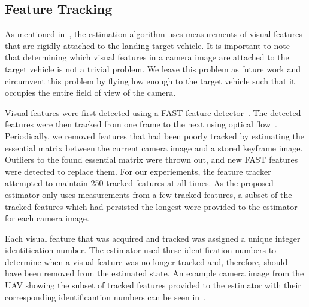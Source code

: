 
\subsection{Feature Tracking}
As mentioned in~,
the estimation algorithm uses measurements of visual features that are
rigidly attached to the landing target vehicle. It is important to note that
determining which visual features in a camera image are attached to
the target vehicle is not a trivial problem. We leave this problem as future work and
circumvent this problem by flying low enough to the target vehicle such that it
occupies the entire field of view of the camera.

Visual features were first detected using a FAST feature
detector~\cite{rosten2006machine}. The detected features were then tracked from one frame to
the next using optical flow~\cite{bouguet2001pyramidal}. Periodically, we
removed
features that had been poorly tracked by estimating the essential matrix between
the current camera image and a stored keyframe image. Outliers to the found
essential matrix were thrown out, and new FAST features were detected to replace
them. For our experiements, the feature tracker attempted to maintain 250
tracked features at all times. As the proposed estimator only uses measurements from a few
tracked features, a subset of the tracked features which had persisted the longest
were provided to the estimator for each camera image.

Each visual feature that was acquired and tracked was assigned a unique integer
identitication number. The estimator used these identification numbers to
determine when a visual feature was no longer tracked and, therefore, should
have been removed from
the estimated state.
An example camera image from the UAV showing the
subset of tracked features provided to the estimator with their corresponding identificantion
numbers can be seen in~.


